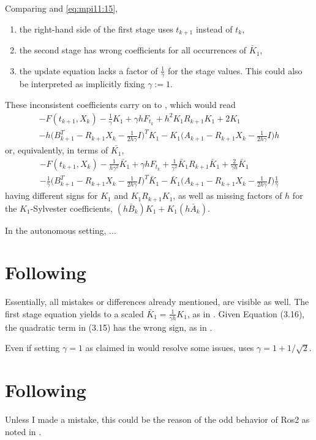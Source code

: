 Comparing \cite[Equation (15)]{MPIMD11-06} and \eqref{eq:mpi11:15},
\begin{enumerate}
  \item
    the right-hand side of the first stage uses $t_{k+1}$ instead of $t_k$,
  \item
    the second stage has wrong coefficients for all occurrences of $\bar{K}_1$,
  \item
    the update equation lacks a factor of $\frac{1}{\gamma}$ for the stage values.
    This could also be interpreted as implicitly fixing $\gamma := 1$.
    \label{item:implicit gamma=1}
\end{enumerate}
These inconsistent coefficients carry on to \cite[Equation (16)]{MPIMD11-06},
which would read
\begin{multline}
  -F(t_{k+1}, X_k) - \tfrac{1}{\gamma} K_1 + \gamma h F_{t_k} + h^2 K_1 R_{k+1} K_1 + 2K_1 \\
  -h \big( B^T_{k+1} - R_{k+1}X_k - \tfrac{1}{2h\gamma}I \big)^T K_1
  -K_1 \big( A_{k+1} - R_{k+1}X_k - \tfrac{1}{2h\gamma}I \big) h
\end{multline}
or, equivalently, in terms of $\bar{K_1}$,
\begin{multline}
  -F(t_{k+1}, X_k) - \tfrac{1}{h\gamma^2} \bar{K}_1 + \gamma h F_{t_k} + \tfrac{1}{\gamma^2} \bar{K}_1 R_{k+1} \bar{K}_1 + \tfrac{2}{\gamma h}\bar{K}_1 \\
  -\tfrac{1}{\gamma} \big( B^T_{k+1} - R_{k+1}X_k - \tfrac{1}{2h\gamma}I \big)^T \bar{K}_1
  -\bar{K}_1 \big( A_{k+1} - R_{k+1}X_k - \tfrac{1}{2h\gamma}I \big) \tfrac{1}{\gamma}
\end{multline}
having different signs for $K_1$ and $K_1R_{k+1}K_1$,
as well as missing factors of $h$ for the $K_1$-Sylvester coefficients, $(h\bar{B}_k) K_1 + K_1 (h\bar{A}_k)$.

In the autonomous setting, ...

\section{Following \cite{MPIMD12-13}}

Essentially, all mistakes or differences already mentioned, are visible as well.
The first stage equation \cite[Equation (3.14)]{MPIMD12-13} yields to a scaled $\bar{K}_1 = \frac{1}{\gamma h}K_1$, as in \cite{MPIMD11-06}.
Given Equation (3.16), the quadratic term in (3.15) has the wrong sign, as in \cite{Mena2007}.

Even if setting $\gamma=1$ as claimed in \cite[17]{MPIMD12-13} would resolve some issues,
\cite{Lang2015} uses $\gamma = 1 + 1/\sqrt{2}$.

\section{Following \cite{Lang2015}}

Unless I made a mistake, this could be the reason of the odd behavior of Ros2 as noted in \cite[63]{Lang2015}.
